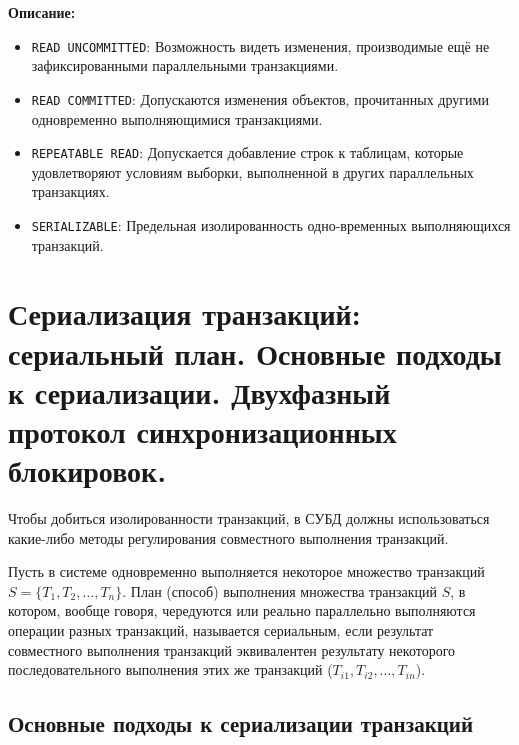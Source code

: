 \documentclass[a4paper,12pt]{article}
\begin{document}
\textbf{Описание:}
\begin{itemize}
    \item \texttt{READ UNCOMMITTED}: Возможность видеть изменения, производимые ещё не зафиксированными параллельными транзакциями.
    \item \texttt{READ COMMITTED}: Допускаются изменения объектов, прочитанных другими одновременно выполняющимися транзакциями.
    \item \texttt{REPEATABLE READ}: Допускается добавление строк к таблицам, которые удовлетворяют условиям выборки, выполненной в других параллельных транзакциях.
    \item \texttt{SERIALIZABLE}: Предельная изолированность одно-временных выполняющихся транзакций.
\end{itemize}





























\section{Сериализация транзакций: сериальный план. Основные подходы к сериализации. Двухфазный протокол синхронизационных блокировок.}

Чтобы добиться изолированности транзакций, в СУБД должны использоваться какие-либо методы регулирования совместного выполнения транзакций.

Пусть в системе одновременно выполняется некоторое множество транзакций $S = \{T_1, T_2, \ldots, T_n\}$. План (способ) выполнения множества транзакций $S$, в котором, вообще говоря, чередуются или реально параллельно выполняются операции разных транзакций, называется сериальным, если результат совместного выполнения транзакций эквивалентен результату некоторого последовательного выполнения этих же транзакций ($T_{i1}, T_{i2}, \ldots, T_{in}$).

\subsection{Основные подходы к сериализации транзакций}
\end{document}
